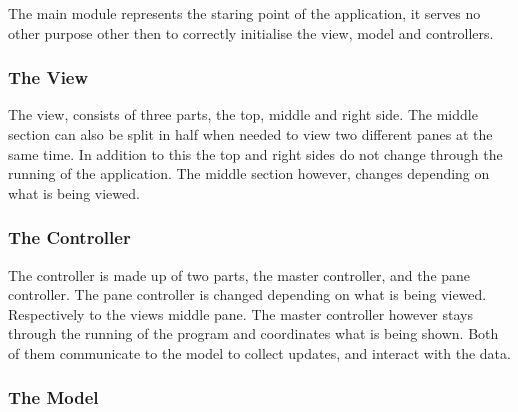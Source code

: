 The main module represents the staring point of the application, it serves no other purpose other then to correctly initialise the view, model and controllers.

\subsubsection{The View}
\label{subsubsec:the_view}

The view, consists of three parts, the top, middle and right side. The middle section can also be split in half when needed to view two different panes at the same time. In addition to this the top and right sides do not change through the running of the application. The middle section however, changes depending on what is being viewed.

\subsubsection{The Controller}
\label{subsubsec:the_controller}

The controller is made up of two parts, the master controller, and the pane controller. The pane controller is changed depending on what is being viewed. Respectively to the views middle pane. The master controller however stays through the running of the program and coordinates what is being shown. Both of them communicate to the model to collect updates, and interact with the data.

\subsubsection{The Model}
\label{subsubsec:the_model}

